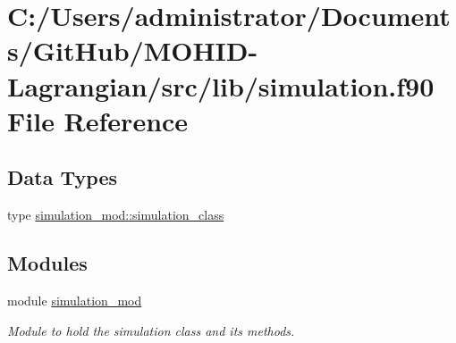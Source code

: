 \hypertarget{simulation_8f90}{}\section{C\+:/\+Users/administrator/\+Documents/\+Git\+Hub/\+M\+O\+H\+I\+D-\/\+Lagrangian/src/lib/simulation.f90 File Reference}
\label{simulation_8f90}
\subsection*{Data Types}
\begin{DoxyCompactItemize}
\item 
type \hyperlink{structsimulation__mod_1_1simulation__class}{simulation\+\_\+mod\+::simulation\+\_\+class}
\end{DoxyCompactItemize}
\subsection*{Modules}
\begin{DoxyCompactItemize}
\item 
module \hyperlink{namespacesimulation__mod}{simulation\+\_\+mod}
\begin{DoxyCompactList}\small\item\em Module to hold the simulation class and its methods. \end{DoxyCompactList}\end{DoxyCompactItemize}
